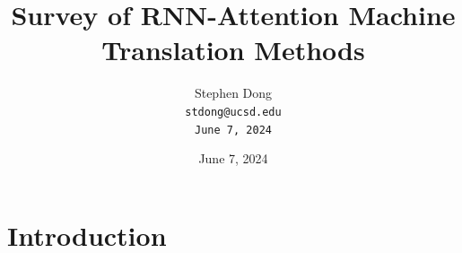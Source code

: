 \documentclass[11pt,a4paper]{article}
\title{Survey of RNN-Attention Machine Translation Methods}
\author{Stephen Dong  \\
  {\tt stdong@ucsd.edu}\\
  {\tt June 7, 2024} \\}
\date{June 7, 2024}
\begin{document}
\maketitle


 
          

\section{Introduction}


\end{document}
